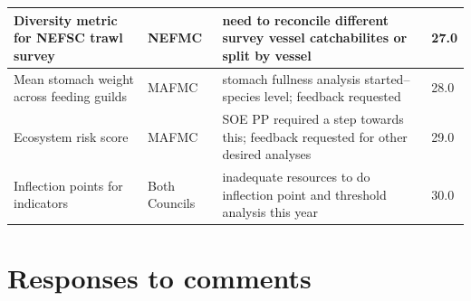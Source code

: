 \documentclass[10pt,]{article}
\let\origtable\table
\let\endorigtable\endtable
\renewenvironment{table}[1][2] {
    \expandafter\origtable\expandafter[H]
} {
    \endorigtable
}
\begin{document}
\begin{table}[!h]
{\begin{tabular}{l|l|l|l}
\hline
Diversity metric for NEFSC trawl survey & NEFMC & need to reconcile different survey vessel catchabilites or split by vessel & 27.0\\
\hline
Mean stomach weight across feeding guilds & MAFMC & stomach fullness analysis started--species level; feedback requested & 28.0\\
\hline
Ecosystem risk score & MAFMC & SOE PP required a step towards this; feedback requested for other desired analyses & 29.0\\
\hline
Inflection points for indicators & Both Councils & inadequate resources to do inflection point and threshold analysis this year & 30.0\\
\hline
\end{tabular}}
\end{table}

\hypertarget{responses-to-comments}{%
\section{Responses to comments}\label{responses-to-comments}}
\end{document}
